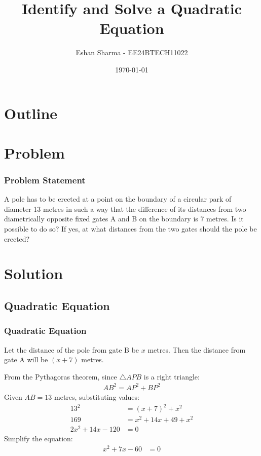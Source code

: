 \documentclass{beamer}
\title{Identify and Solve a Quadratic Equation}
\author{Eshan Sharma - EE24BTECH11022}
\date{\today}
\theoremstyle{remark}
\numberwithin{equation}{section}
\begin{document}
	
	\begin{frame}
		\titlepage
	\end{frame}
	
	\section*{Outline}
	\begin{frame}
		\tableofcontents
	\end{frame}
	
	\section{Problem}
	\begin{frame}
		\frametitle{Problem Statement}
		A pole has to be erected at a point on the boundary of a circular park of diameter 13 metres in such a way that the difference of its distances from two diametrically opposite fixed gates A and B on the boundary is 7 metres. Is it possible to do so? If yes, at what distances from the two gates should the pole be erected?
	\end{frame}
	
	\section{Solution}
	
	\subsection{Quadratic Equation}
	\begin{frame}
		\frametitle{Quadratic Equation}
		
		Let the distance of the pole from gate B be \(x\) metres. Then the distance from gate A will be \((x+7)\) metres.
		
		From the Pythagoras theorem, since \(\triangle APB\) is a right triangle:
		\begin{align}
			AB^2 = AP^2 + BP^2
		\end{align}
		Given \(AB = 13\) metres, substituting values:
		\begin{align}
			13^2 &= (x+7)^2 + x^2 \\
			169 &= x^2 + 14x + 49 + x^2 \\
			2x^2 + 14x - 120 &= 0
		\end{align}
		Simplify the equation:
		\begin{align}
			x^2 + 7x - 60 &= 0
		\end{align}
	\end{frame}
	
\end{document}

